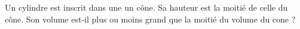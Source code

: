 
Un cylindre est inscrit dans une un cône. Sa hauteur est la moitié de celle du cône. Son volume est-il plus ou moins grand que la moitié du volume du cone ?